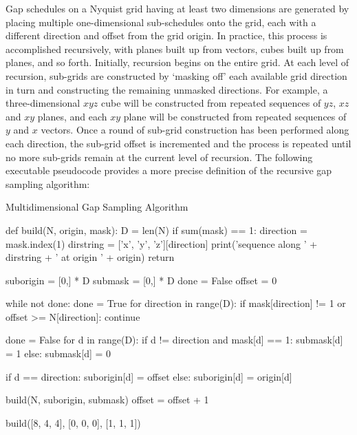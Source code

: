 \begin{doublespace}
Gap schedules on a Nyquist grid having at least two dimensions are generated
by placing multiple one-dimensional sub-schedules onto the grid, each with a
different direction and offset from the grid origin. In practice, this process
is accomplished recursively, with planes built up from vectors, cubes built up
from planes, and so forth. Initially, recursion begins on the entire grid. At
each level of recursion, sub-grids are constructed by `masking off' each
available grid direction in turn and constructing the remaining unmasked
directions. For example, a three-dimensional $xyz$ cube will be constructed
from repeated sequences of $yz$, $xz$ and $xy$ planes, and each $xy$ plane
will be constructed from repeated sequences of $y$ and $x$ vectors. Once a
round of sub-grid construction has been performed along each direction, the
sub-grid offset is incremented and the process is repeated until no more
sub-grids remain at the current level of recursion. The following executable
pseudocode provides a more precise definition of the recursive gap sampling
algorithm:
\end{doublespace}

\begin{algorithm}[H]
\caption{Multidimensional Gap Sampling Algorithm}
\label{algorithm.2.1}
\begin{python}
def build(N, origin, mask):
  D = len(N)
  if sum(mask) == 1:
    direction = mask.index(1)
    dirstring = ['x', 'y', 'z'][direction]
    print('sequence along ' + dirstring + ' at origin ' + origin)
    return

  suborigin = [0,] * D
  submask = [0,] * D
  done = False
  offset = 0

  while not done:
    done = True
    for direction in range(D):
      if mask[direction] != 1 or offset >= N[direction]:
        continue

      done = False
      for d in range(D):
        if d != direction and mask[d] == 1:
          submask[d] = 1
        else:
          submask[d] = 0

        if d == direction:
          suborigin[d] = offset
        else:
          suborigin[d] = origin[d]

      build(N, suborigin, submask)
    offset = offset + 1

build([8, 4, 4], [0, 0, 0], [1, 1, 1])
\end{python}
\end{algorithm}

